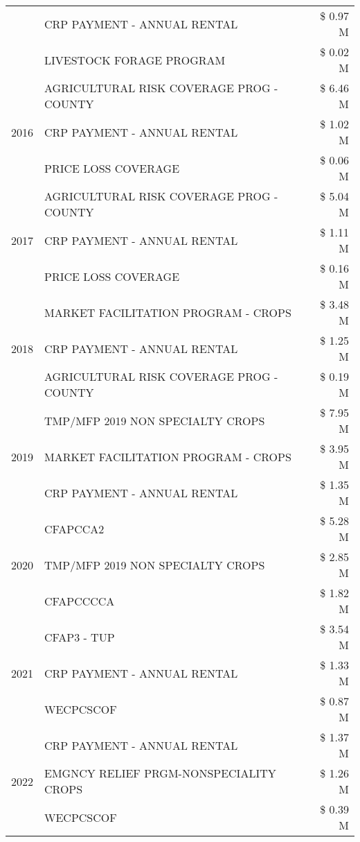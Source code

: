 \begin{tabular}{llr}
 & CRP PAYMENT - ANNUAL RENTAL & \$ 0.97 M \\
 & LIVESTOCK FORAGE PROGRAM & \$ 0.02 M \\
\cline{1-3}
\multirow[t]{3}{*}{2016} & AGRICULTURAL RISK COVERAGE PROG - COUNTY & \$ 6.46 M \\
 & CRP PAYMENT - ANNUAL RENTAL & \$ 1.02 M \\
 & PRICE LOSS COVERAGE & \$ 0.06 M \\
\cline{1-3}
\multirow[t]{3}{*}{2017} & AGRICULTURAL RISK COVERAGE PROG - COUNTY & \$ 5.04 M \\
 & CRP PAYMENT - ANNUAL RENTAL & \$ 1.11 M \\
 & PRICE LOSS COVERAGE & \$ 0.16 M \\
\cline{1-3}
\multirow[t]{3}{*}{2018} & MARKET FACILITATION PROGRAM - CROPS & \$ 3.48 M \\
 & CRP PAYMENT - ANNUAL RENTAL & \$ 1.25 M \\
 & AGRICULTURAL RISK COVERAGE PROG - COUNTY & \$ 0.19 M \\
\cline{1-3}
\multirow[t]{3}{*}{2019} & TMP/MFP 2019 NON SPECIALTY CROPS & \$ 7.95 M \\
 & MARKET FACILITATION PROGRAM - CROPS & \$ 3.95 M \\
 & CRP PAYMENT - ANNUAL RENTAL & \$ 1.35 M \\
\cline{1-3}
\multirow[t]{3}{*}{2020} & CFAPCCA2 & \$ 5.28 M \\
 & TMP/MFP 2019 NON SPECIALTY CROPS & \$ 2.85 M \\
 & CFAPCCCCA & \$ 1.82 M \\
\cline{1-3}
\multirow[t]{3}{*}{2021} & CFAP3 - TUP & \$ 3.54 M \\
 & CRP PAYMENT - ANNUAL RENTAL & \$ 1.33 M \\
 & WECPCSCOF & \$ 0.87 M \\
\cline{1-3}
\multirow[t]{3}{*}{2022} & CRP PAYMENT - ANNUAL RENTAL & \$ 1.37 M \\
 & EMGNCY RELIEF PRGM-NONSPECIALITY CROPS & \$ 1.26 M \\
 & WECPCSCOF & \$ 0.39 M \\
\cline{1-3}
\bottomrule
\end{tabular}
